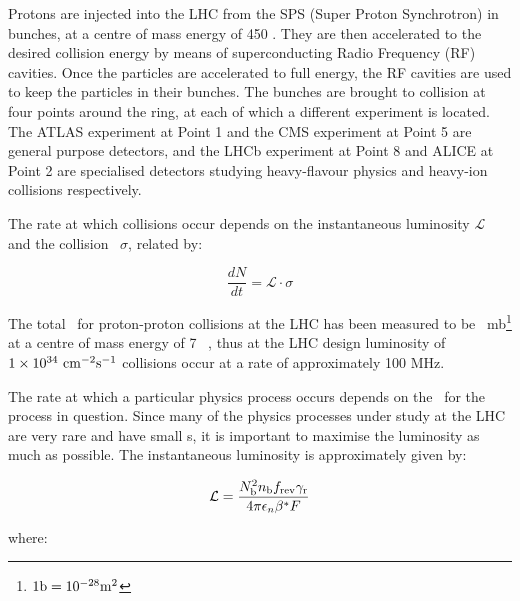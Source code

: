 Protons are injected into the LHC from the SPS (Super Proton Synchrotron) in
bunches, at a centre of mass energy of 450 \GeV. They are then accelerated to the desired
collision energy by means of superconducting Radio Frequency (RF) cavities. Once the
particles are accelerated to full energy, the RF cavities are used to keep the
particles in their bunches. The bunches are brought to collision at four points
around the ring, at each of which a different experiment is located. The ATLAS
experiment at Point 1 and the CMS experiment at Point 5 are general purpose
detectors, and the LHCb experiment at Point 8 and ALICE at Point 2 are
specialised detectors studying heavy-flavour physics and heavy-ion collisions
respectively.


The rate at which collisions occur depends on the instantaneous luminosity
$\mathcal{L}$ and the collision \cx\ $\sigma$, related by:

\begin{equation}
\frac{dN}{dt} = \mathcal{L} \cdot \sigma
\end{equation}

The total \cx\ for
proton-proton collisions at the LHC has been measured to be
~mb\footnote{$1 \rm{b} = 10^{-28}
m^{2}$} at a centre of mass energy of 7 \tev~\cite{0295-5075-96-2-21002}, thus
at the LHC design luminosity of $1 \times 10^{34}~\rm{cm}^{-2}\rm{s}^{-1}$
collisions occur at a rate of approximately 100 MHz. 

The rate at which a particular
physics process occurs depends on the \cx\ for the process in question.
Since many of the physics processes under study at the LHC are very rare and
have small \cx s, it is important to maximise the luminosity as much as
possible. The instantaneous luminosity is approximately given by:

\begin{equation}
\mathcal{L} = \frac{N_{\rm{b}}^{2}n_{\rm{b}}f_{\rm{rev}}\gamma_{\rm{r}}}{4\pi
\epsilon_{n}\beta^{*} F}
\end{equation}

where:

